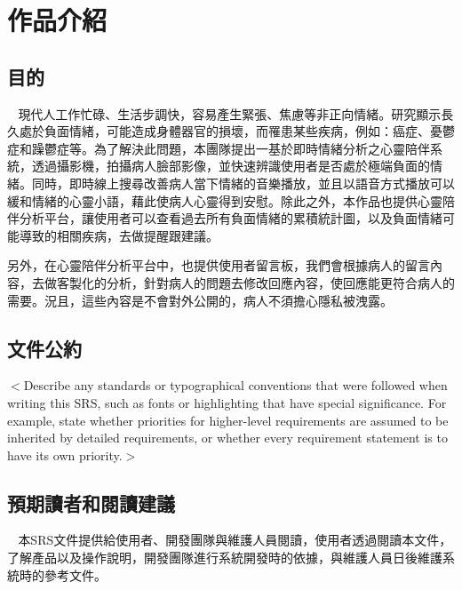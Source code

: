 \documentclass[12pt]{scrreprt}
\begin{document}
\chapter{作品介紹}

\section{目的}

$~~~~$現代人工作忙碌、生活步調快，容易產生緊張、焦慮等非正向情緒。研究顯示長久處於負面情緒，可能造成身體器官的損壞，而罹患某些疾病，例如：癌症、憂鬱症和躁鬱症等。為了解決此問題，本團隊提出一基於即時情緒分析之心靈陪伴系統，透過攝影機，拍攝病人臉部影像，並快速辨識使用者是否處於極端負面的情緒。同時，即時線上搜尋改善病人當下情緒的音樂播放，並且以語音方式播放可以緩和情緒的心靈小語，藉此使病人心靈得到安慰。除此之外，本作品也提供心靈陪伴分析平台，讓使用者可以查看過去所有負面情緒的累積統計圖，以及負面情緒可能導致的相關疾病，去做提醒跟建議。

另外，在心靈陪伴分析平台中，也提供使用者留言板，我們會根據病人的留言內容，去做客製化的分析，針對病人的問題去修改回應內容，使回應能更符合病人的需要。況且，這些內容是不會對外公開的，病人不須擔心隱私被洩露。

\section{文件公約} %
$<$Describe any standards or typographical conventions that were followed when 
writing this SRS, such as fonts or highlighting that have special significance.  
For example, state whether priorities  for higher-level requirements are assumed 
to be inherited by detailed requirements, or whether every requirement statement 
is to have its own priority.$>$

\section{預期讀者和閱讀建議}

$~~~~$本SRS文件提供給使用者、開發團隊與維護人員閱讀，使用者透過閱讀本文件，了解產品以及操作說明，開發團隊進行系統開發時的依據，與維護人員日後維護系統時的參考文件。 \\
\end{document}
